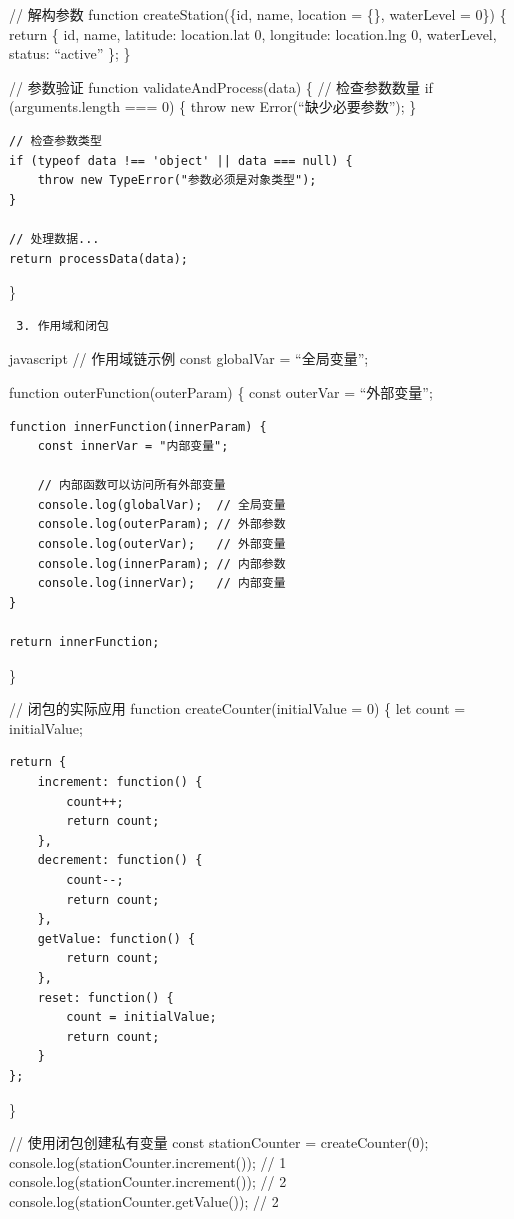 {// 解构参数 function createStation(\{id, name, location = \{\}, waterLevel = 0\}) \{ return \{ id, name, latitude: location.lat \textbar\textbar{} 0, longitude: location.lng \textbar\textbar{} 0, waterLevel, status: ``active'' \}; \}

// 参数验证 function validateAndProcess(data) \{ // 检查参数数量 if (arguments.length === 0) \{ throw new Error(``缺少必要参数''); \}

\begin{verbatim}
// 检查参数类型
if (typeof data !== 'object' || data === null) {
    throw new TypeError("参数必须是对象类型");
}

// 处理数据...
return processData(data);
\end{verbatim}

\}

\begin{lstlisting}
 3. 作用域和闭包
\end{lstlisting}

javascript // 作用域链示例 const globalVar = ``全局变量'';

function outerFunction(outerParam) \{ const outerVar = ``外部变量'';

\begin{verbatim}
function innerFunction(innerParam) {
    const innerVar = "内部变量";
    
    // 内部函数可以访问所有外部变量
    console.log(globalVar);  // 全局变量
    console.log(outerParam); // 外部参数
    console.log(outerVar);   // 外部变量
    console.log(innerParam); // 内部参数
    console.log(innerVar);   // 内部变量
}

return innerFunction;
\end{verbatim}

\}

// 闭包的实际应用 function createCounter(initialValue = 0) \{ let count = initialValue;

\begin{verbatim}
return {
    increment: function() {
        count++;
        return count;
    },
    decrement: function() {
        count--;
        return count;
    },
    getValue: function() {
        return count;
    },
    reset: function() {
        count = initialValue;
        return count;
    }
};
\end{verbatim}

\}

// 使用闭包创建私有变量 const stationCounter = createCounter(0); console.log(stationCounter.increment()); // 1 console.log(stationCounter.increment()); // 2 console.log(stationCounter.getValue()); // 2

}
